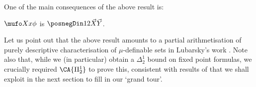 One of the main consequences of the above result is:
\begin{corollary}
    [$\PSCA$]
    \label{cor:lfp-of-posD12-is-posD12}
    $\mufo X x \phi$ is $\posnegDin 1 2 {\vec X}{\vec Y}$.
\end{corollary}









Let us point out that the above result amounts to a partial arithmetisation of purely descriptive characterisation of $\mu$-definable sets in Lubarsky's work \cite{Lubarsky93}.
Note also that, while we (in particular) obtain a $\Delta^1_2$ bound on fixed point formulas, we crucially required $\CA{\Pi^1_2}$ to prove this, consistent with results of \cite{Moellerfeld02:phd-thesis} that we shall exploit in the next section to fill in our `grand tour'. 

